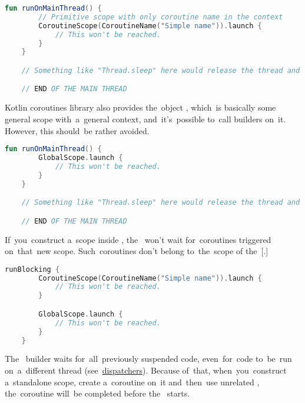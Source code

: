 \begin{lstlisting}[language=Kotlin]
    fun runOnMainThread() {
        // Primitive scope with only coroutine name in the context
        CoroutineScope(CoroutineName("Simple name")).launch {
            // This won't be reached.
        }
    }

    // Something like "Thread.sleep" here would release the thread and the callback would run.

    // END OF THE MAIN THREAD
\end{lstlisting}
\newline

\noindent Kotlin coroutines library also provides the~object , which~is basically some general scope with~a~general context, and~it's~possible to~call builders on~it.
However, this should~be rather avoided.

\begin{lstlisting}[language=Kotlin]
    fun runOnMainThread() {
        GlobalScope.launch {
            // This won't be reached.
        }
    }

    // Something like "Thread.sleep" here would release the thread and the callback would run.

    // END OF THE MAIN THREAD
\end{lstlisting}

\warning If~you~construct a~scope inside , the~ won't wait for~coroutines triggered on~that~new scope.
Such~coroutines don't belong to~the~scope of the~[.]
\newpage

\begin{lstlisting}[language=Kotlin]
    runBlocking {
        CoroutineScope(CoroutineName("Simple name")).launch {
            // This won't be reached.
        }

        GlobalScope.launch {
            // This won't be reached.
        }
    }
\end{lstlisting}

\note The~ builder waits for~all~previously suspended code, even~for~code to~be~run on~a~different thread (see~\hyperref[kotlincoroutinedispatcher]{dispatchers}).
Because of~that, when~you~construct a~standalone scope, create a~coroutine on~it and~then~use unrelated , the~coroutine will~be completed before the~ starts.

